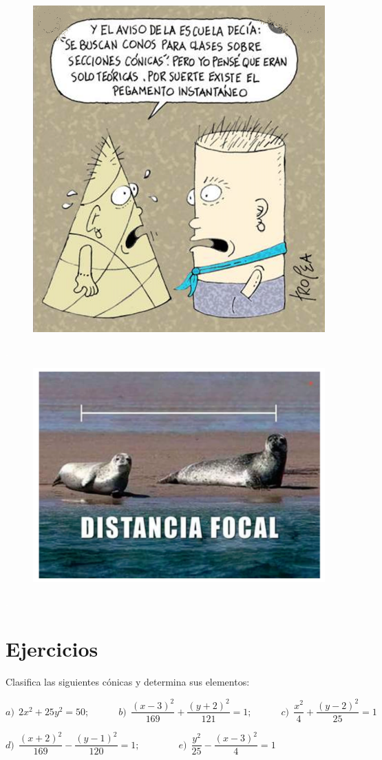 \begin{multicols}{2}
\begin{figure}[H]
	\centering
	\includegraphics[width=.45\textwidth]{img-conicas/xiste01.png}
	\end{figure}

\textcolor{white}{.} 
\begin{figure}[H]
	\centering
	\includegraphics[width=.5\textwidth]{img-conicas/xiste02.png}
	\end{figure}	
\textcolor{white}{.} 
\end{multicols}



\vspace{1cm}
\section{Ejercicios}
\vspace{0.5cm}



\begin{mipropuesto}

Clasifica las siguientes cónicas y determina sus elementos:

\vspace{4mm} $a)\ \ 2x^2+25y^2=50;\qquad \quad b)\ \ \dfrac{(x-3)^2}{169}+\dfrac{(y+2)^2}{121}=1;\qquad \quad c)\ \ \dfrac{x^2}{4}+\dfrac{(y-2)^2}{25}=1$

\vspace{2mm} $d)\ \ \dfrac{(x+2)^2}{169}-\dfrac{(y-1)^2}{120}=1;\qquad \qquad e)\ \ \dfrac{y^2}{25}-\dfrac{(x-3)^2}{4}=1$
	
\end{mipropuesto}

